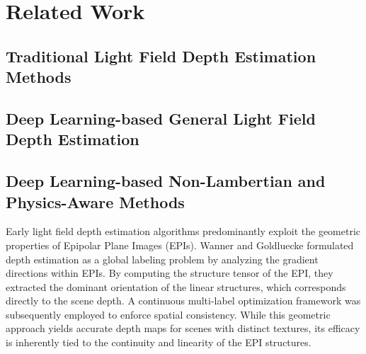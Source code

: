 \section{Related Work}

\subsection{Traditional Light Field Depth Estimation Methods}

\subsection{Deep Learning-based General Light Field Depth Estimation}

\subsection{Deep Learning-based Non-Lambertian and Physics-Aware Methods}

Early light field depth estimation algorithms predominantly exploit the geometric properties of Epipolar Plane Images (EPIs). Wanner and Goldluecke formulated depth estimation as a global labeling problem by analyzing the gradient directions within EPIs. By computing the structure tensor of the EPI, they extracted the dominant orientation of the linear structures, which corresponds directly to the scene depth. A continuous multi-label optimization framework was subsequently employed to enforce spatial consistency. While this geometric approach yields accurate depth maps for scenes with distinct textures, its efficacy is inherently tied to the continuity and linearity of the EPI structures.